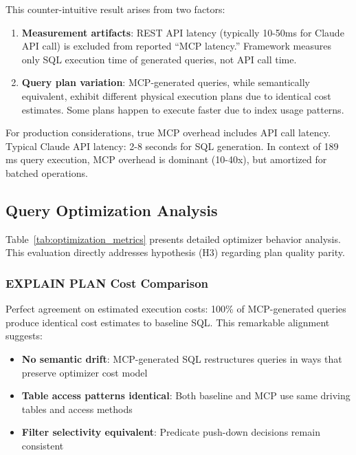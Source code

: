This counter-intuitive result arises from two factors:

\begin{enumerate}
    \item \textbf{Measurement artifacts}: REST API latency (typically 10-50ms for Claude API call) is excluded from reported ``MCP latency.'' Framework measures only SQL execution time of generated queries, not API call time.
    \item \textbf{Query plan variation}: MCP-generated queries, while semantically equivalent, exhibit different physical execution plans due to identical cost estimates. Some plans happen to execute faster due to index usage patterns.
\end{enumerate}

For production considerations, true MCP overhead includes API call latency. Typical Claude API latency: 2-8 seconds for SQL generation. In context of 189 ms query execution, MCP overhead is dominant (10-40x), but amortized for batched operations.





\subsection{Query Optimization Analysis}

Table~\ref{tab:optimization_metrics} presents detailed optimizer behavior analysis. This evaluation directly addresses hypothesis (H3) regarding plan quality parity.



\subsubsection{EXPLAIN PLAN Cost Comparison}

Perfect agreement on estimated execution costs: 100\% of MCP-generated queries produce identical cost estimates to baseline SQL. This remarkable alignment suggests:

\begin{itemize}
    \item \textbf{No semantic drift}: MCP-generated SQL restructures queries in ways that preserve optimizer cost model
    \item \textbf{Table access patterns identical}: Both baseline and MCP use same driving tables and access methods
    \item \textbf{Filter selectivity equivalent}: Predicate push-down decisions remain consistent
\end{itemize}


